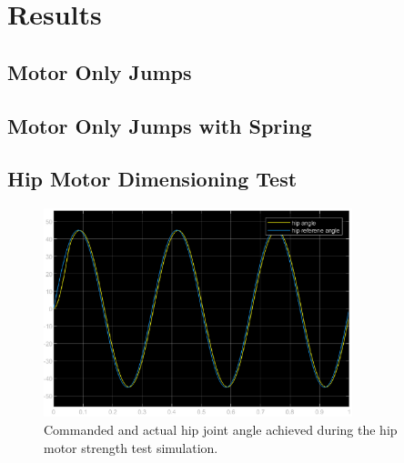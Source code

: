 \section{Results}

\subsection{Motor Only Jumps}
\label{sec:results_motor_only_jumps}

\subsection{Motor Only Jumps with Spring}
\label{sec:results_motor_only_jumps_with_spring}

\subsection{Hip Motor Dimensioning Test}

\begin{figure}[H]
    \centering
    \includegraphics[width=0.8\textwidth]{Images/attitude_stable_test_result.eps}
    \caption{Commanded and actual hip joint angle achieved during the hip motor strength test simulation. }
    \label{fig:hip_motor_strength_test}
\end{figure}